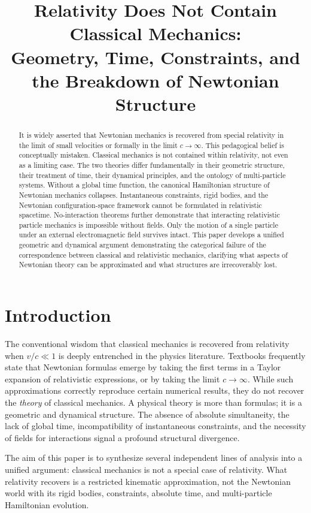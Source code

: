 \documentclass[12pt]{article}
\title{Relativity Does Not Contain Classical Mechanics:\\Geometry, Time, Constraints, and the Breakdown of Newtonian Structure}
\author{}
\date{}
\begin{document}
\maketitle

\begin{abstract}
It is widely asserted that Newtonian mechanics is recovered from special relativity in the limit of small velocities or formally in the limit $c \to \infty$. This pedagogical belief is conceptually mistaken. Classical mechanics is not contained within relativity, not even as a limiting case. The two theories differ fundamentally in their geometric structure, their treatment of time, their dynamical principles, and the ontology of multi-particle systems. Without a global time function, the canonical Hamiltonian structure of Newtonian mechanics collapses. Instantaneous constraints, rigid bodies, and the Newtonian configuration-space framework cannot be formulated in relativistic spacetime. No-interaction theorems further demonstrate that interacting relativistic particle mechanics is impossible without fields. Only the motion of a single particle under an external electromagnetic field survives intact. This paper develops a unified geometric and dynamical argument demonstrating the categorical failure of the correspondence between classical and relativistic mechanics, clarifying what aspects of Newtonian theory can be approximated and what structures are irrecoverably lost.
\end{abstract}

\section{Introduction}
The conventional wisdom that classical mechanics is recovered from relativity when $v/c \ll 1$ is deeply entrenched in the physics literature. Textbooks frequently state that Newtonian formulas emerge by taking the first terms in a Taylor expansion of relativistic expressions, or by taking the limit $c \to \infty$. While such approximations correctly reproduce certain numerical results, they do not recover the \emph{theory} of classical mechanics. A physical theory is more than formulas; it is a geometric and dynamical structure. The absence of absolute simultaneity, the lack of global time, incompatibility of instantaneous constraints, and the necessity of fields for interactions signal a profound structural divergence.

The aim of this paper is to synthesize several independent lines of analysis into a unified argument: classical mechanics is not a special case of relativity. What relativity recovers is a restricted kinematic approximation, not the Newtonian world with its rigid bodies, constraints, absolute time, and multi-particle Hamiltonian evolution.
\end{document}
